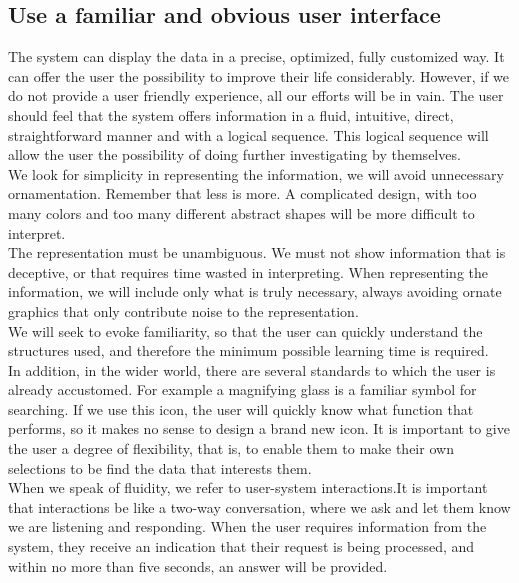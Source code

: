 \subsection{Use a familiar and obvious user interface}

The system can display the data in a precise, optimized, fully customized way. It can offer the user
the possibility to improve their life considerably. However, if we do not provide a user friendly experience, all our efforts will be in vain.
The user should feel that the system offers information in a fluid, intuitive, direct, straightforward manner and with
a logical sequence. This logical sequence will allow the user the possibility of doing further investigating by themselves.\\

We look for simplicity in representing the information, we will avoid unnecessary ornamentation. Remember that less is more. A complicated design, with too many colors and too many different abstract shapes will be more difficult to interpret.\\

The representation must be unambiguous. We must not show information that is deceptive, or that requires time wasted in interpreting. When representing the information, we will 
include only what is truly necessary, always avoiding ornate graphics that only contribute noise to the representation.\\

We will seek to evoke familiarity, so that the user can quickly understand the structures used,
and therefore the minimum possible learning time is required.\\

In addition, in the wider world, there are several standards to which the user is already accustomed.
For example a magnifying glass is a familiar symbol for searching. If we use this icon, the user will quickly know what
function that performs, so it makes no sense to design a brand new icon.
It is important to give the user a degree of flexibility, that is, to enable them to make their own selections to be find the data that interests them.\\

When we speak of fluidity, we refer to user-system interactions.It is important that interactions
be like a two-way conversation, where we ask and let them know we are listening and responding. When the user
requires information from the system, they receive an indication that their request is being processed, and within no more than five seconds, an answer will be provided.
    
